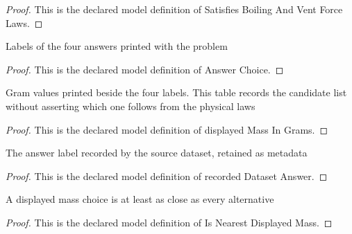 \begin{proof}
  This is the declared model definition of Satisfies Boiling And Vent Force Laws.
\end{proof}
\begin{definition}
  \label{def:physics:phyx-mini-0484:phyxminiproblems-problemphyxmini0484-answerchoice}
  Labels of the four answers printed with the problem
\end{definition}
\begin{proof}
  This is the declared model definition of Answer Choice.
\end{proof}
\begin{definition}
  \label{def:physics:phyx-mini-0484:phyxminiproblems-problemphyxmini0484-displayedmassingrams}
  Gram values printed beside the four labels. This table records the candidate list without asserting which one follows from the physical laws
\end{definition}
\begin{proof}
  This is the declared model definition of displayed Mass In Grams.
\end{proof}
\begin{definition}
  \label{def:physics:phyx-mini-0484:phyxminiproblems-problemphyxmini0484-recordeddatasetanswer}
  The answer label recorded by the source dataset, retained as metadata
\end{definition}
\begin{proof}
  This is the declared model definition of recorded Dataset Answer.
\end{proof}
\begin{definition}
  \label{def:physics:phyx-mini-0484:phyxminiproblems-problemphyxmini0484-isnearestdisplayedmass}
  A displayed mass choice is at least as close as every alternative
\end{definition}
\begin{proof}
  This is the declared model definition of Is Nearest Displayed Mass.
\end{proof}

